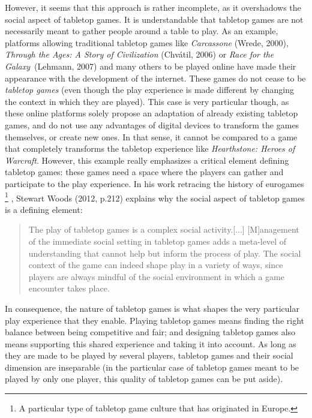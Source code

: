 However, it seems that this approach is rather incomplete, as it overshadows the social aspect of tabletop games. It is understandable that tabletop games are not necessarily meant to gather people around a table to play. As an example, platforms allowing traditional tabletop games like \textit{Carcassone} (Wrede, 2000)\cite{game:carca}, \textit{Through the Ages: A Story of Civilization} (Chvátil, 2006)\cite{game:ages} or \textit{Race for the Galaxy}\ (Lehmann, 2007)\cite{game:race} and many others to be played online have made their appearance with the development of the internet. 
These games do not cease to be \textit{tabletop games} (even though the play experience is made different by changing the context in which they are played). This case is very particular though, as these online platforms solely propose an adaptation of already existing tabletop games, and do not use any advantages of digital devices to transform the games themselves, or create new ones. In that sense, it cannot be compared to a game that completely transforms the tabletop experience like \textit{Hearthstone: Heroes of Warcraft}.  However, this example really emphasizes a critical element defining tabletop games: these games need a space where the players can gather and participate to the play experience. In his work retracing the history of eurogames
\footnote{A particular type of tabletop game culture that has originated in Europe.}
, Stewart Woods (2012, p.212)\cite{book:euro} explains why the social aspect of tabletop games is a defining element:
\begin{quotation}
The play of tabletop games is a complex social activity.[...] [M]anagement of the immediate social setting in tabletop games adds a meta-level of understanding that cannot help but inform the process of play. The social context of the game can indeed shape play in a variety of ways, since players are always mindful of the social environment in which a game encounter takes place.
\end{quotation}
In consequence, the nature of tabletop games is what shapes the very particular play experience that they enable. Playing tabletop games means finding the right balance between being competitive and fair; and designing tabletop games also means supporting this shared experience and taking it into account. As long as they are made to be played by several players, tabletop games and their social dimension are inseparable (in the particular case of tabletop games meant to be played by only one player, this quality of tabletop games can be put aside).

